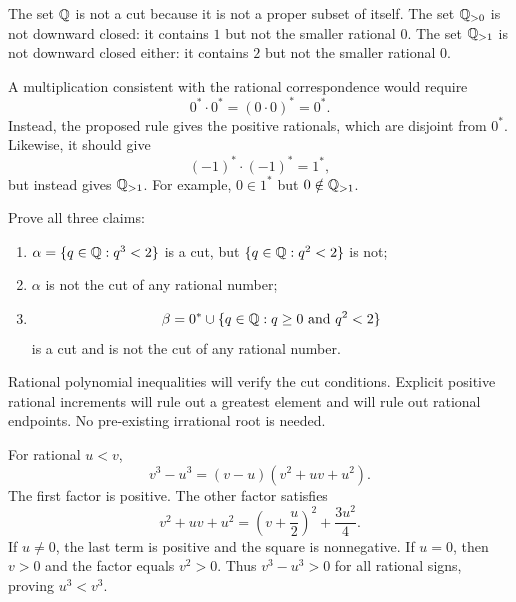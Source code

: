 The set $\mathbb{Q}$ is not a cut because it is not a proper subset of itself.
The set $\mathbb{Q}_{>0}$ is not downward closed: it contains $1$ but not the
smaller rational $0$. The set $\mathbb{Q}_{>1}$ is not downward closed either:
it contains $2$ but not the smaller rational $0$.

A multiplication consistent with the rational correspondence would require
\[
 0^*\cdot0^*=(0\cdot0)^*=0^*.
\]
Instead, the proposed rule gives the positive rationals, which are
disjoint from $0^*$. Likewise, it should give
\[
 (-1)^*\cdot(-1)^*=1^*,
\]
but instead gives $\mathbb{Q}_{>1}$. For example, $0\in1^*$ but
$0\notin\mathbb{Q}_{>1}$.



\goal Prove all three claims:
\begin{enumerate}[label=(\alph*)]
 \item $\alpha=\{q\in\mathbb{Q}:q^3<2\}$ is a cut, but
       $\{q\in\mathbb{Q}:q^2<2\}$ is not;
 \item $\alpha$ is not the cut of any rational number;
 \item
       \[
        \beta=0^*\cup\{q\in\mathbb{Q}:q\ge0\text{ and }q^2<2\}
       \]
       is a cut and is not the cut of any rational number.
\end{enumerate}

\idea Rational polynomial inequalities will verify the cut conditions.
Explicit positive rational increments will rule out a greatest element
and will rule out rational endpoints. No pre-existing irrational root
is needed.

For rational $u<v$,
\[
 v^3-u^3=(v-u)(v^2+uv+u^2).
\]
The first factor is positive. The other factor satisfies
\[
 v^2+uv+u^2=\left(v+\frac u2\right)^2+\frac{3u^2}{4}.
\]
If $u\ne0$, the last term is positive and the square is nonnegative.
If $u=0$, then $v>0$ and the factor equals $v^2>0$.
Thus $v^3-u^3>0$ for all rational signs, proving $u^3<v^3$.

